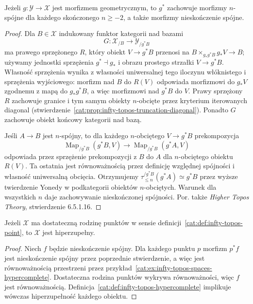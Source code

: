 \begin{stwierdzenie}\label{cat:prop:infty-topos-geometric-connectivity}
Jeżeli $g:\mathcal Y\to\mathcal X$ jest morfizmem geometrycznym, to $g^*$ zachowuje morfizmy $n$-spójne dla każdego skończonego $n\geq-2$, a także morfizmy nieskończenie spójne.
\end{stwierdzenie}
\begin{proof}
Dla $B\in\mathcal X$ indukowany funktor kategorii nad bazami
\[
 G:\mathcal X_{/B}\longrightarrow\mathcal Y_{/g^*B}
\]
ma prawego sprzężonego $R$, który obiekt $V\to g^*B$ przenosi na $B\times_{g_*g^*B}g_*V\to B$; używamy jednostki sprzężenia $g^*\dashv g_*$ i obrazu prostego strzałki $V\to g^*B$. Własność sprzężenia wynika z własności uniwersalnej tego iloczynu włóknistego i sprzężenia wyjściowego: morfizm nad $B$ do $R(V)$ odpowiada morfizmowi do $g_*V$ zgodnemu z mapą do $g_*g^*B$, a więc morfizmowi nad $g^*B$ do $V$. Prawy sprzężony $R$ zachowuje granice i tym samym obiekty $n$-obcięte przez kryterium iterowanych diagonal (stwierdzenie~\ref{cat:prop:infty-topos-truncation-diagonal}). Ponadto $G$ zachowuje obiekt końcowy kategorii nad bazą.

Jeśli $A\to B$ jest $n$-spójny, to dla każdego $n$-obciętego $V\to g^*B$ prekompozycja
\[
 \operatorname{Map}_{/g^*B}(g^*B,V)\longrightarrow
 \operatorname{Map}_{/g^*B}(g^*A,V)
\]
odpowiada przez sprzężenie prekompozycji z $B$ do $A$ dla $n$-obciętego obiektu $R(V)$. Ta ostatnia jest równoważnością przez definicję względnej spójności i własność uniwersalną obcięcia. Otrzymujemy $\tau_{\leq n}^{/g^*B}(g^*A)\simeq g^*B$ przez wyższe twierdzenie Yonedy w podkategorii obiektów $n$-obciętych. Warunek dla wszystkich $n$ daje zachowywanie nieskończonej spójności. Por. także \emph{Higher Topos Theory}, stwierdzenie 6.5.1.16.
\end{proof}

\begin{wniosek}\label{cat:cor:infty-topos-enough-points-hypercomplete}
Jeżeli $\mathcal X$ ma dostateczną rodzinę punktów w sensie definicji~\ref{cat:def:infty-topos-point}, to $\mathcal X$ jest hiperzupełny.
\end{wniosek}
\begin{proof}
Niech $f$ będzie nieskończenie spójny. Dla każdego punktu $p$ morfizm $p^*f$ jest nieskończenie spójny przez poprzednie stwierdzenie, a więc jest równoważnością przestrzeni przez przykład~\ref{cat:ex:infty-topos-spaces-hypercomplete}. Dostateczna rodzina punktów wykrywa równoważności, więc $f$ jest równoważnością. Definicja~\ref{cat:def:infty-topos-hypercomplete} implikuje wówczas hiperzupełność każdego obiektu.
\end{proof}

